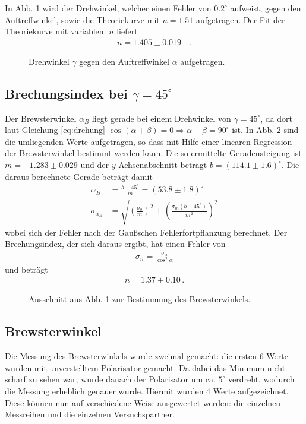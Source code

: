 \documentclass[12pt,a4paper,titlepage,headinclude,bibtotoc]{scrartcl}
\begin{document}
In Abb. \ref{fig:drehung} wird der Drehwinkel, welcher einen Fehler von $0.2^\circ$ aufweist, gegen den Auftreffwinkel, sowie die Theoriekurve mit $n=1.51$ aufgetragen.
Der Fit der Theoriekurve mit variablem $n$ liefert
\begin{align*}
	n=1.405\pm 0.019\quad .
\end{align*}
\begin{figure}[h]
	\centering
	
	\caption{Drehwinkel $\gamma$ gegen den Auftreffwinkel $\alpha$ aufgetragen.}
	\label{fig:drehung}
\end{figure}

\subsection{Brechungsindex bei $\gamma=45^\circ$}
Der Brewsterwinkel $\alpha_B$ liegt gerade bei einem Drehwinkel von $\gamma=45^\circ$, da dort laut Gleichung \eqref{eq:drehung} $\cos (\alpha + \beta) = 0 \Rightarrow \alpha + \beta = 90^\circ$ ist.
In Abb. \ref{fig:brewster} sind die umliegenden Werte aufgetragen, so dass mit Hilfe einer linearen Regression der Brewsterwinkel bestimmt werden kann.
Die so ermittelte Geradensteigung ist $m=-1.283\pm 0.029$ und der $y$-Achsenabschnitt beträgt $b=(114.1\pm 1.6)^\circ$.
Die daraus berechnete Gerade beträgt damit
\begin{align}
	\alpha_B&=\frac{b-45^\circ}{m} = (53.8\pm 1.8)^\circ\\
	\sigma_{\alpha_B}&=\sqrt{\left( \frac{\sigma_b}{m} \right)^2 + \left( \frac{\sigma_m(b-45^\circ)}{m^2} \right)^2}
\end{align}
wobei sich der Fehler nach der Gaußschen Fehlerfortpflanzung berechnet.
Der Brechungsindex, der sich daraus ergibt, hat einen Fehler von
\begin{align*}
	\sigma_n=\frac{\sigma_\alpha}{\cos ^2\alpha}
\end{align*}
und beträgt 
\begin{align}
	n=1.37\pm 0.10\, .
\end{align}



\begin{figure}[h]
	\centering
	
	\caption{Ausschnitt aus Abb. \ref{fig:drehung} zur Bestimmung des Brewsterwinkels.}
	\label{fig:brewster}
\end{figure}

\subsection{Brewsterwinkel}
Die Messung des Brewsterwinkels wurde zweimal gemacht: die ersten 6 Werte wurden mit unverstelltem Polarisator gemacht.
Da dabei das Minimum nicht scharf zu sehen war, wurde danach der Polarisator um ca. $5^\circ$ verdreht, wodurch die Messung erheblich genauer wurde.
Hiermit wurden 4 Werte aufgezeichnet.
Diese können nun auf verschiedene Weise ausgewertet werden: die einzelnen Messreihen und die einzelnen Versuchspartner.
\end{document}
